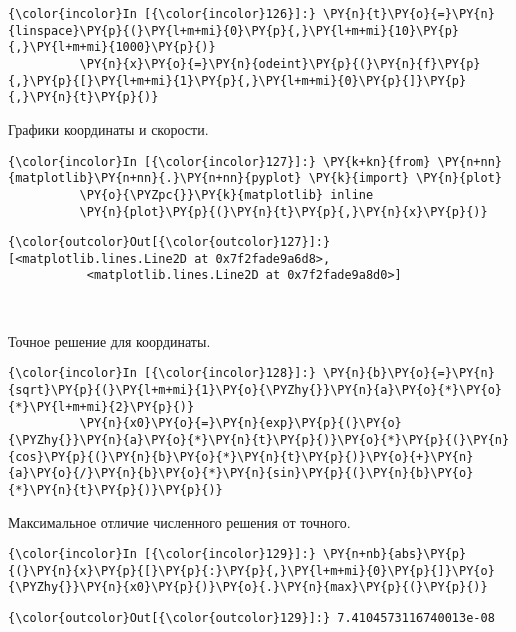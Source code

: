     \begin{Verbatim}[commandchars=\\\{\}]
{\color{incolor}In [{\color{incolor}126}]:} \PY{n}{t}\PY{o}{=}\PY{n}{linspace}\PY{p}{(}\PY{l+m+mi}{0}\PY{p}{,}\PY{l+m+mi}{10}\PY{p}{,}\PY{l+m+mi}{1000}\PY{p}{)}
          \PY{n}{x}\PY{o}{=}\PY{n}{odeint}\PY{p}{(}\PY{n}{f}\PY{p}{,}\PY{p}{[}\PY{l+m+mi}{1}\PY{p}{,}\PY{l+m+mi}{0}\PY{p}{]}\PY{p}{,}\PY{n}{t}\PY{p}{)}
\end{Verbatim}

    Графики координаты и скорости.

    \begin{Verbatim}[commandchars=\\\{\}]
{\color{incolor}In [{\color{incolor}127}]:} \PY{k+kn}{from} \PY{n+nn}{matplotlib}\PY{n+nn}{.}\PY{n+nn}{pyplot} \PY{k}{import} \PY{n}{plot}
          \PY{o}{\PYZpc{}}\PY{k}{matplotlib} inline
          \PY{n}{plot}\PY{p}{(}\PY{n}{t}\PY{p}{,}\PY{n}{x}\PY{p}{)}
\end{Verbatim}

            \begin{Verbatim}[commandchars=\\\{\}]
{\color{outcolor}Out[{\color{outcolor}127}]:} [<matplotlib.lines.Line2D at 0x7f2fade9a6d8>,
           <matplotlib.lines.Line2D at 0x7f2fade9a8d0>]
\end{Verbatim}
        
    \begin{center}
    \end{center}
    { \hspace*{\fill} \\}
    
    Точное решение для координаты.

    \begin{Verbatim}[commandchars=\\\{\}]
{\color{incolor}In [{\color{incolor}128}]:} \PY{n}{b}\PY{o}{=}\PY{n}{sqrt}\PY{p}{(}\PY{l+m+mi}{1}\PY{o}{\PYZhy{}}\PY{n}{a}\PY{o}{*}\PY{o}{*}\PY{l+m+mi}{2}\PY{p}{)}
          \PY{n}{x0}\PY{o}{=}\PY{n}{exp}\PY{p}{(}\PY{o}{\PYZhy{}}\PY{n}{a}\PY{o}{*}\PY{n}{t}\PY{p}{)}\PY{o}{*}\PY{p}{(}\PY{n}{cos}\PY{p}{(}\PY{n}{b}\PY{o}{*}\PY{n}{t}\PY{p}{)}\PY{o}{+}\PY{n}{a}\PY{o}{/}\PY{n}{b}\PY{o}{*}\PY{n}{sin}\PY{p}{(}\PY{n}{b}\PY{o}{*}\PY{n}{t}\PY{p}{)}\PY{p}{)}
\end{Verbatim}

    Максимальное отличие численного решения от точного.

    \begin{Verbatim}[commandchars=\\\{\}]
{\color{incolor}In [{\color{incolor}129}]:} \PY{n+nb}{abs}\PY{p}{(}\PY{n}{x}\PY{p}{[}\PY{p}{:}\PY{p}{,}\PY{l+m+mi}{0}\PY{p}{]}\PY{o}{\PYZhy{}}\PY{n}{x0}\PY{p}{)}\PY{o}{.}\PY{n}{max}\PY{p}{(}\PY{p}{)}
\end{Verbatim}

            \begin{Verbatim}[commandchars=\\\{\}]
{\color{outcolor}Out[{\color{outcolor}129}]:} 7.4104573116740013e-08
\end{Verbatim}
